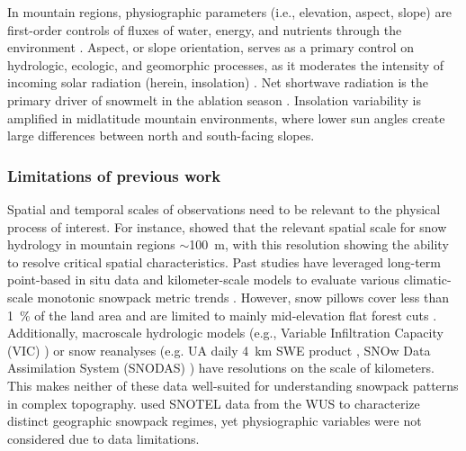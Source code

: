 In mountain regions, physiographic parameters (i.e., elevation, aspect, slope) are first-order controls of fluxes of water, energy, and nutrients through the environment \citep{pelletierWhichWayYou2018a}. Aspect, or slope orientation, serves as a primary control on hydrologic, ecologic, and geomorphic processes, as it moderates the intensity of incoming solar radiation (herein, insolation) \citep{broxtonRoleAspectQuantify2009}. Net shortwave radiation is the primary driver of snowmelt in the ablation season \citep{marksClimateEnergyExchange1992a}. Insolation variability is amplified in midlatitude mountain environments, where lower sun angles create large differences between north and south-facing slopes. 

\hypertarget{ch2-intro-4}{\subsubsection{Limitations of previous work}\label{ch2-intro-4}}


Spatial and temporal scales of observations need to be relevant to the physical process of interest. For instance, \cite{bloschlScalingIssuesSnow1999} showed that the relevant spatial scale for snow hydrology in mountain regions $\sim$100~m, with this resolution showing the ability to resolve critical spatial characteristics. Past studies have leveraged long-term point-based in situ data \citep{clowChangesTimingSnowmelt2010,harpoldChangesSnowpackAccumulation2012a,kapnickCausesRecentChanges2012,musselmanWinterMeltTrends2021} and kilometer-scale models to evaluate various climatic-scale monotonic snowpack metric trends 
\citep{moteDECLININGMOUNTAINSNOWPACK2005, moteDramaticDeclinesSnowpack2018, zengSnowpackChange19822018, haleDriversSpatiotemporalPatterns2023}. However, snow pillows cover less than 1~\% of the land area and are limited to mainly mid-elevation flat forest cuts \citep{guan20102011Snow2013}. Additionally, macroscale hydrologic models (e.g., Variable Infiltration Capacity (VIC) \citep{liangSimpleHydrologicallyBased1994}) or snow reanalyses (e.g. UA daily 4~km SWE product \citep{broxtonLinkingSnowfallSnow2016}, SNOw Data Assimilation System (SNODAS) \citep{barrettNationalOperationalHydrologic2003}) have resolutions on the scale of kilometers. This makes neither of these data well-suited for understanding snowpack patterns in complex topography. \cite{trujilloSnowpackRegimesWestern2014} used SNOTEL data from the WUS to characterize distinct geographic snowpack regimes, yet physiographic variables were not considered due to data limitations.

